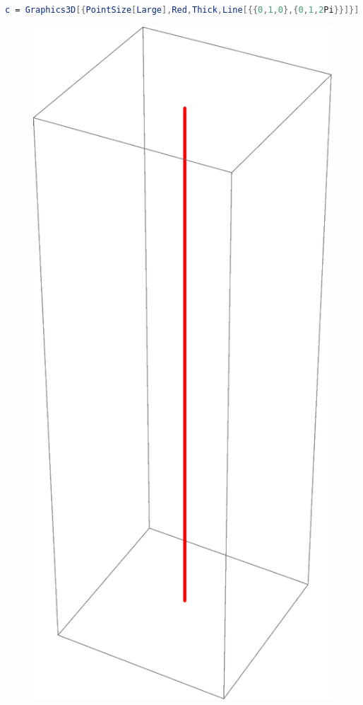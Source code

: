 \documentclass[a4paper, 12pt]{article}
\begin{document}
\begin{lstlisting}[language=Mathematica]
c = Graphics3D[{PointSize[Large],Red,Thick,Line[{{0,1,0},{0,1,2Pi}}]}]
\end{lstlisting}

\begin{figure}[!h]
	\centering
	\includegraphics[scale=.3]{images/Line}
\end{figure}
\end{document}
